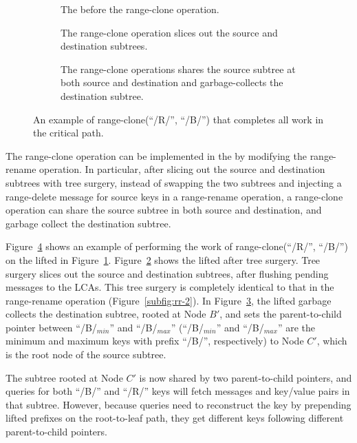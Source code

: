 \begin{figure}
    \begin{subfigure}{\textwidth}
        \centering
        
        \caption{\label{subfig:rc-1} The \bet before the range-clone operation.}
    \end{subfigure}
    \begin{subfigure}{\textwidth}
        \centering
        
        \caption{\label{subfig:rc-2} The range-clone operation slices out the
            source and destination subtrees.}
    \end{subfigure}
    \begin{subfigure}{\textwidth}
        \centering
        
        \caption{\label{subfig:rc-3} The range-clone operations shares the source
            subtree at both source and destination and garbage-collects the
            destination subtree.}
    \end{subfigure}
    \caption[All operations in range-clone]{\label{fig:rc}
        An example of range-clone(``/R/'', ``/B/'') that completes all work
        in the critical path.}
\end{figure}

The range-clone operation can be implemented in the \bet by modifying the
range-rename operation.
In particular, after slicing out the source and destination subtrees with tree
surgery,
instead of swapping the two subtrees and injecting a range-delete message
for source keys in a range-rename operation,
a range-clone operation can share the source subtree in both source and
destination,
and garbage collect the destination subtree.

Figure~\ref{fig:rc} shows an example of performing the work of
range-clone(``/R/'', ``/B/'') on the lifted \bet in Figure~\ref{subfig:rc-1}.
Figure~\ref{subfig:rc-2} shows the lifted \bet after tree surgery.
Tree surgery slices out the source and destination subtrees,
after flushing pending messages to the LCAs.
This tree surgery is completely identical to that in the range-rename operation
(Figure~\ref{subfig:rr-2}).
In Figure~\ref{subfig:rc-3}, the lifted \bet garbage collects the destination
subtree, rooted at Node $B'$, and sets the parent-to-child pointer between
``/B/$_{min}$'' and ``/B/$_{max}$''
(``/B/$_{min}$'' and ``/B/$_{max}$'' are the minimum and maximum keys with
prefix ``/B/'', respectively)
to Node $C'$,
which is the root node of the source subtree.

The subtree rooted at Node $C'$ is now shared by two parent-to-child pointers,
and queries for
both ``/B/'' and ``/R/'' keys will fetch messages and key/value pairs in that
subtree.
However, because queries need to reconstruct the key by prepending lifted
prefixes on the root-to-leaf path, they get different keys following different
parent-to-child pointers.

